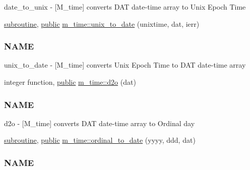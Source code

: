 \begin{DoxyCompactItemize}
\begin{DoxyCompactList}
date\+\_\+to\+\_\+unix -\/ \mbox{[}M\+\_\+time\mbox{]} converts D\+AT date-\/time array to Unix Epoch Time \end{DoxyCompactList}\item 
\hyperlink{M__stopwatch_83_8txt_acfbcff50169d691ff02d4a123ed70482}{subroutine}, \hyperlink{M__stopwatch_83_8txt_a2f74811300c361e53b430611a7d1769f}{public} \hyperlink{namespacem__time_acc62ada23f8fa2fe67b428702fbcbf1c}{m\+\_\+time\+::unix\+\_\+to\+\_\+date} (unixtime, dat, ierr)
\begin{DoxyCompactList}\small\item\em \subsubsection*{N\+A\+ME}

unix\+\_\+to\+\_\+date -\/ \mbox{[}M\+\_\+time\mbox{]} converts Unix Epoch Time to D\+AT date-\/time array \end{DoxyCompactList}\item 
integer function, \hyperlink{M__stopwatch_83_8txt_a2f74811300c361e53b430611a7d1769f}{public} \hyperlink{namespacem__time_a727dd77bbd4a5d0e3947c5d303845947}{m\+\_\+time\+::d2o} (dat)
\begin{DoxyCompactList}\small\item\em \subsubsection*{N\+A\+ME}

d2o -\/ \mbox{[}M\+\_\+time\mbox{]} converts D\+AT date-\/time array to Ordinal day \end{DoxyCompactList}\item 
\hyperlink{M__stopwatch_83_8txt_acfbcff50169d691ff02d4a123ed70482}{subroutine}, \hyperlink{M__stopwatch_83_8txt_a2f74811300c361e53b430611a7d1769f}{public} \hyperlink{namespacem__time_aa4dca4409bf20a011bb04988c1335d63}{m\+\_\+time\+::ordinal\+\_\+to\+\_\+date} (yyyy, ddd, dat)
\begin{DoxyCompactList}\small\item\em \subsubsection*{N\+A\+ME}


\end{DoxyCompactList}
\end{DoxyCompactItemize}

